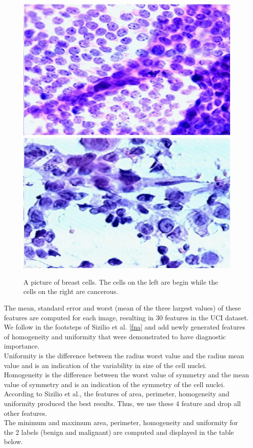 \begin{figure}
	\centering
	\includegraphics[width=0.45\linewidth]{screenshot001}
	\hspace{0.5cm}
	\includegraphics[width=0.45\linewidth]{screenshot002}
	\caption{A picture of breast cells. The cells on the left are begin while the cells on the right are cancerous.}
	\label{fig:images}
\end{figure}

The mean, standard error and worst (mean of the three largest values) of these features are computed for each image, resulting in 30 features in the UCI dataset. \\

\iffalse
We follow in the footsteps of Sizilio et al. \ref{fna} and add newly generated features of homogeneity and uniformity that were demonstrated to have diagnostic importance. \\

Uniformity is the difference between the radius worst value and the radius mean value and is an indication of the variability in size of the cell nuclei. \\

Homogeneity is the difference between the worst value of symmetry and the mean value of symmetry and is an indication of the symmetry of the cell nuclei. \\

According to Sizilio et al., the features of area, perimeter, homogeneity and uniformity produced the best results. Thus, we use these 4 feature and drop all other features. \\

The minimum and maximum area, perimeter, homogeneity and uniformity for the 2 labels (benign and malignant) are computed and displayed in the table below. \\

